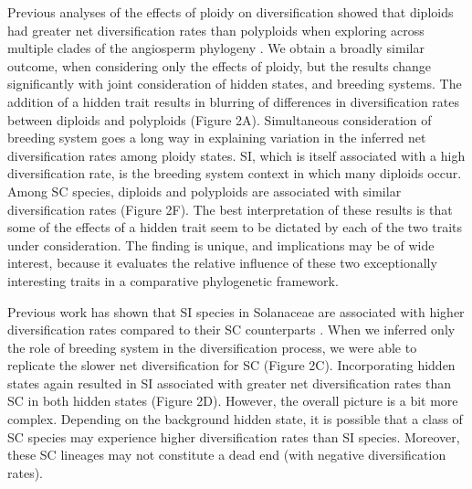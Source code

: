Previous analyses of the effects of ploidy on diversification showed that diploids had greater net diversification rates than polyploids when exploring across multiple clades of the angiosperm phylogeny \citet{mayrose_2011, mayrose_2015}. 
We obtain a broadly similar outcome, when considering only the effects of ploidy, but the results change significantly with joint consideration of hidden states, and breeding systems. 
The addition of a hidden trait results in blurring of differences in diversification rates between diploids and polyploids (Figure 2A). %
Simultaneous consideration of breeding system goes a long way in explaining variation in the inferred net diversification rates among ploidy states.
SI, which is itself associated with a high diversification rate, is the breeding system context in which many diploids occur.
Among SC species, diploids and polyploids are associated with similar diversification rates (Figure 2F). %
The best interpretation of these results is that some of the effects of a hidden trait seem to be dictated by  each of the two traits under consideration.
The finding is unique, and implications may be of wide interest, because it evaluates the relative influence of these two exceptionally interesting traits in a comparative phylogenetic framework.

Previous work has shown that SI species in Solanaceae are associated with higher diversification rates compared to their SC counterparts \citep{goldberg_2010}. 
When we inferred only the role of breeding system in the diversification process, we were able to replicate the slower net diversification for SC (Figure 2C).  %
Incorporating hidden states again resulted in SI associated with greater net diversification rates than SC in both hidden states (Figure 2D). 
However, the overall picture is a bit more complex.
Depending on the background hidden state, it is possible that a class of SC species may experience higher diversification rates than SI species.
Moreover, these SC lineages may not constitute a dead end (with negative diversification rates).




